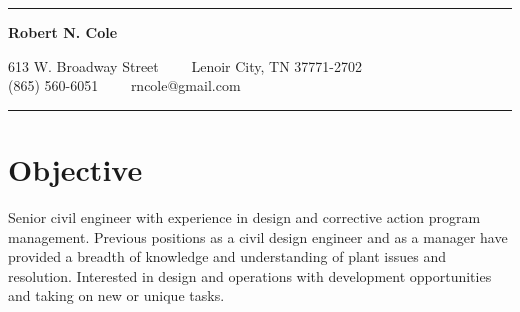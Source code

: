 \documentclass[10pt,letterpaper]{article}
\begin{document}
\hrule
\begin{center}
{\LARGE \textbf{Robert N. Cole}}

613 W. Broadway Street\ \ \textbullet
\ \ Lenoir City, TN 37771-2702
\\
\hspace{.35em}(865) 560-6051\ \ \textbullet
\ \ rncole@gmail.com
\end{center}
\hrule
\vspace{-0.4em}

\section*{Objective}
Senior civil engineer with experience in design and corrective action program management. Previous positions as a civil design engineer and as a manager have provided a breadth of knowledge and understanding of plant issues and resolution. Interested in design and operations with development opportunities and taking on new or unique tasks.\\
\end{document}
